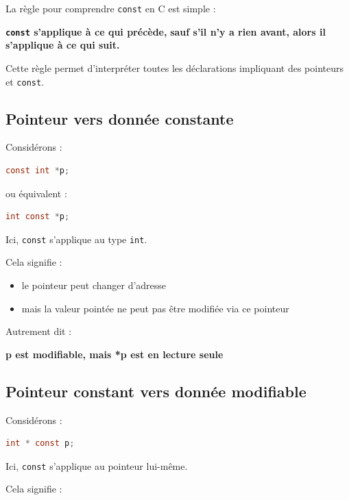 La règle pour comprendre \texttt{const} en C est simple :

\begin{center}
\textbf{\texttt{const} s’applique à ce qui précède,}
\textbf{sauf s’il n’y a rien avant, alors il s’applique à ce qui suit.}
\end{center}

Cette règle permet d’interpréter toutes les déclarations
impliquant des pointeurs et \texttt{const}.

\subsection{Pointeur vers donnée constante}

Considérons :

\begin{lstlisting}[language=C]
const int *p;
\end{lstlisting}

ou équivalent :

\begin{lstlisting}[language=C]
int const *p;
\end{lstlisting}

Ici, \texttt{const} s’applique au type \texttt{int}.

Cela signifie :

\begin{itemize}
    \item le pointeur peut changer d’adresse
    \item mais la valeur pointée ne peut pas être modifiée via ce pointeur
\end{itemize}

Autrement dit :

\begin{center}
\textbf{p est modifiable, mais *p est en lecture seule}
\end{center}

\subsection{Pointeur constant vers donnée modifiable}

Considérons :

\begin{lstlisting}[language=C]
int * const p;
\end{lstlisting}

Ici, \texttt{const} s’applique au pointeur lui-même.

Cela signifie :

